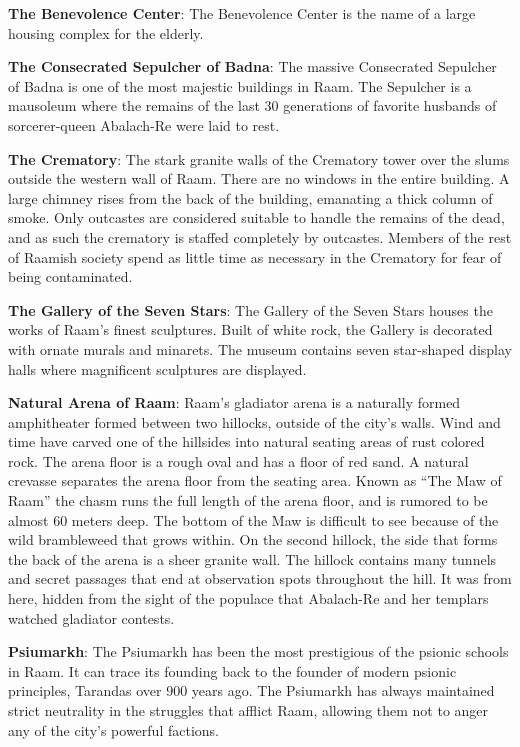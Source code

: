 {
	\textbf{The Benevolence Center}: The Benevolence Center is the name of a large housing complex for the elderly.

	\textbf{The Consecrated Sepulcher of Badna}: The massive Consecrated Sepulcher of Badna is one of the most majestic buildings in Raam. The Sepulcher is a mausoleum where the remains of the last 30 generations of favorite husbands of sorcerer-queen Abalach-Re were laid to rest.

	\textbf{The Crematory}: The stark granite walls of the Crematory tower over the slums outside the western wall of Raam. There are no windows in the entire building. A large chimney rises from the back of the building, emanating a thick column of smoke. Only outcastes are considered suitable to handle the remains of the dead, and as such the crematory is staffed completely by outcastes. Members of the rest of Raamish society spend as little time as necessary in the Crematory for fear of being contaminated.

	\textbf{The Gallery of the Seven Stars}: The Gallery of the Seven Stars houses the works of Raam's finest sculptures. Built of white rock, the Gallery is decorated with ornate murals and minarets. The museum contains seven star-shaped display halls where magnificent sculptures are displayed.

	\textbf{Natural Arena of Raam}: Raam's gladiator arena is a naturally formed amphitheater formed between two hillocks, outside of the city's walls. Wind and time have carved one of the hillsides into natural seating areas of rust colored rock. The arena floor is a rough oval and has a floor of red sand. A natural crevasse separates the arena floor from the seating area. Known as ``The Maw of Raam'' the chasm runs the full length of the arena floor, and is rumored to be almost 60 meters deep. The bottom of the Maw is difficult to see because of the wild brambleweed that grows within. On the second hillock, the side that forms the back of the arena is a sheer granite wall. The hillock contains many tunnels and secret passages that end at observation spots throughout the hill. It was from here, hidden from the sight of the populace that Abalach-Re and her templars watched gladiator contests.

	\textbf{Psiumarkh}: The Psiumarkh has been the most prestigious of the psionic schools in Raam. It can trace its founding back to the founder of modern psionic principles, Tarandas over 900 years ago. The Psiumarkh has always maintained strict neutrality in the struggles that afflict Raam, allowing them not to anger any of the city's powerful factions.

}

